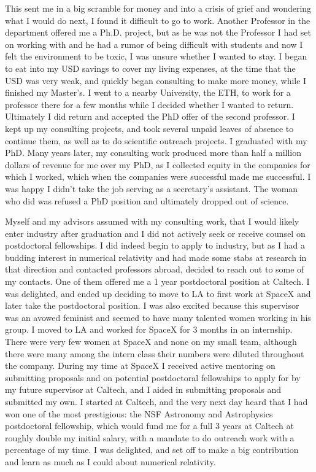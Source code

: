 \documentclass[utf8]{frontiersSCNS} %
\begin{document}
This sent me in a big scramble for money and into a crisis of grief and wondering what I would do next, I found it difficult to go to work. Another Professor in the department offered me a Ph.D. project, but as he was not the Professor I had set on working with and he had a rumor of being difficult with students and now I felt the environment to be toxic, I was unsure whether I wanted to stay. I began to eat into my USD savings to cover my living expenses, at the time that the USD was very weak, and quickly began consulting to make more money, while I finished my Master's. I went to a nearby University, the ETH, to work for a professor there for a few months while I decided whether I wanted to return. Ultimately I did return and accepted the PhD offer of the second professor. I kept up my consulting projects, and took several unpaid leaves of absence to continue them, as well as to do scientific outreach projects. I graduated with my PhD. Many years later, my consulting work produced more than half a million dollars of revenue for me over my PhD, as I collected equity in the companies for which I worked, which when the companies were successful made me successful. I was happy I didn't take the job serving as a secretary's assistant. The woman who did was refused a PhD position and ultimately dropped out of science.

Myself and my advisors assumed with my consulting work, that I would likely enter industry after graduation and I did not actively seek or receive counsel on postdoctoral fellowships. I did indeed begin to apply to industry, but as I had a budding interest in numerical relativity and had made some stabs at research in that direction and contacted professors abroad, decided to reach out to some of my contacts. One of them offered me a 1 year postdoctoral position at Caltech. I was delighted, and ended up deciding to move to LA to first work at SpaceX and later take the postdoctoral position. I was also excited because this supervisor was an avowed feminist and seemed to have many talented women working in his group. I moved to LA and worked for SpaceX for 3 months in an internship. There were very few women at SpaceX and none on my small team, although there were many among the intern class their numbers were diluted throughout the company. During my time at SpaceX I received active mentoring on submitting proposals and on potential postdoctoral fellowships to apply for by my future supervisor at Caltech, and I aided in submitting proposals and submitted my own. I started at Caltech, and the very next day heard that I had won one of the most prestigious: the NSF Astronomy and Astrophysics postdoctoral fellowship, which would fund me for a full 3 years at Caltech at roughly double my initial salary, with a mandate to do outreach work with a percentage of my time. I was delighted, and set off to make a big contribution and learn as much as I could about numerical relativity.
\end{document}
